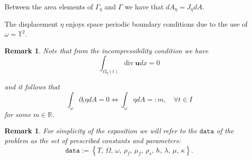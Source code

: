 \documentclass[10pt,a4paper]{article}
\newtheorem{remark}[theorem]{Remark}
\numberwithin{equation}{section}
\begin{document}
Between the area elements of $\Gamma_{\eta}$ and $\Gamma$ we have that
$dA_{\eta}=J_{\eta}dA$.











The displacement $\eta$ enjoys space periodic boundary conditions due to the use of $\omega=\mathbb{T}^{2}$.

\begin{remark}\label{rmk:int-eta-constant-time}
    Note that from the incompressibility condition we have
    \[
    \int_{\Omega_{\eta}\left(t\right)}\text{div} \ \mathbf{u}dx=0
    \]

   and  it follows that 
\[
\int_{\omega}\partial_{t}\eta dA=0\Longleftrightarrow\int_{\omega}\eta dA=:m,\quad\forall t\in I
\]
for some $m \in \mathbb{R}$.
\end{remark}


\begin{remark}\label{rmk:data}
For simplicity of the exposition we will refer to the $\texttt{data}$ of the problem as the set of prescribed constants and parameters:
\begin{equation}\label{eqn:data}
\texttt{data}:=\left\{ T,\,\Omega,\,\omega,\,\rho_{f},\,\mu_{f},\,\rho_{s},\,h,\,\lambda,\,\mu,\,\kappa\right\}.
\end{equation}
\end{remark}
\end{document}
